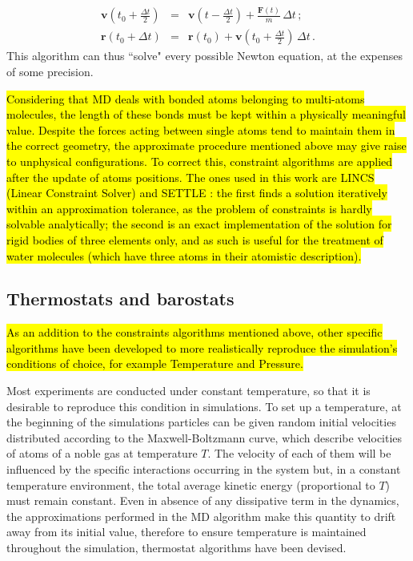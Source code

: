 \begin{eqnarray}
\mathbf{v}\left(t_0 + \frac{\Delta t}{2}\right) &=& \mathbf{v}\left(t - \frac{\Delta t}{2}\right) + \frac{\mathbf{F}(t)}{m} \, \Delta t \, ; \\
\mathbf{r}(t_0 + \Delta t) &=& \mathbf{r}(t_0) + \mathbf{v}\left(t_0 + \frac{\Delta t}{2}\right) \, \Delta t \, .
\end{eqnarray}
This algorithm can thus ``solve" every possible Newton equation, at the expenses of some precision.

\hl{Considering that MD deals with bonded atoms belonging to multi-atoms molecules, the length of these bonds must be kept within a physically meaningful value. Despite the forces acting between single atoms tend to maintain them in the correct geometry, the approximate procedure mentioned above may give raise to unphysical configurations. To correct this, constraint algorithms are applied after the update of atoms positions. The ones used in this work are LINCS (Linear Constraint Solver) \cite{Hess1997} and SETTLE \cite{Miyamoto1992}: the first finds a solution iteratively within an approximation tolerance, as the problem of constraints is hardly solvable analytically; the second is an exact implementation of the solution for rigid bodies of three elements only, and as such is useful for the treatment of water molecules (which have three atoms in their atomistic description).}

\subsection{Thermostats and barostats}
\hl{As an addition to the constraints algorithms mentioned above, other specific algorithms have been developed to more realistically reproduce the simulation's conditions of choice, for example Temperature and Pressure.}

Most experiments are conducted under constant temperature, so that it is desirable to reproduce this condition in simulations.
%
To set up a temperature, at the beginning of the simulations particles can be given random initial velocities distributed according to the Maxwell-Boltzmann curve, which describe velocities of atoms of a noble gas at temperature $T$. The velocity of each of them will be influenced by the specific interactions occurring in the system but, in a constant temperature environment, the total average kinetic energy (proportional to $T$) must remain constant.
%
Even in absence of any dissipative term in the dynamics, the approximations performed in the MD algorithm make this quantity to drift away from its initial value, therefore to ensure temperature is maintained throughout the simulation, thermostat algorithms have been devised.

